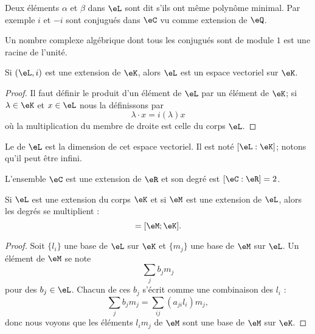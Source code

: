 Deux éléments \( \alpha\) et \( \beta\) dans \( \eL\) sont dit  s'ils ont même polynôme minimal. Par exemple \( i\) et \( -i\) sont conjugués dans \( \eC\) vu comme extension de \( \eQ\).

\begin{lemma}
    Un nombre complexe algébrique dont tous les conjugués sont de module \( 1\) est une racine de l'unité.
\end{lemma}

\begin{lemma}       \label{LemooOLIIooXzdppM}
    Si \( (\eL,i)\) est une extension de \( \eK\), alors \( \eL\) est un espace vectoriel sur \( \eK\).
\end{lemma}

\begin{proof}
    Il faut définir le produit d'un élément de \( \eL\) par un élément de \( \eK\); si \( \lambda\in \eK\) et \( x\in \eL\) nous la définissons par
    \begin{equation}
        \lambda\cdot x=i(\lambda)x
    \end{equation}
    où la multiplication du membre de droite est celle du corps \( \eL\). 
\end{proof}

\begin{definition}      \label{DefUYiyieu}
    Le  de \( \eL\) est la dimension de cet espace vectoriel. Il est noté \( [\eL:\eK]\); notons qu'il peut être infini.
\end{definition}

\begin{example}
    L'ensemble \( \eC\) est une extension de \( \eR\) et son degré est \( [\eC:\eR]=2\).
\end{example}

\begin{proposition}     \label{PropGWazMpY}
    Si \( \eL\) est une extension du corps \( \eK\) et si \( \eM\) est une extension de \( \eL\), alors les degrés se multiplient :
    \begin{equation}
        [\eM:\eL][\eL:\eK]=[\eM;\eK].
    \end{equation}
\end{proposition}

\begin{proof}
    Soit \( \{ l_i \}\) une base de \( \eL\) sur \( \eK\) et \( \{ m_j \}\) une base de \( \eM\) sur \( \eL\). Un élément de \( \eM\) se note
    \begin{equation}
        \sum_{j}b_jm_j
    \end{equation}
    pour des \( b_j\in \eL\). Chacun de ces \( b_j\) s'écrit comme une combinaison des \( l_i\) :
    \begin{equation}
        \sum_{j}b_jm_j=\sum_{ij}(a_{ji}l_i)m_j,
    \end{equation}
    donc nous voyons que les éléments \( l_im_j\) de \( \eM\) sont une base de \( \eM\) sur \( \eK\).
\end{proof}

